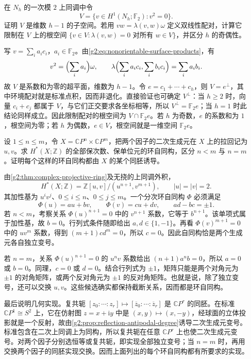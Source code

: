 \begin{exercise}\label{g2:ex:nonorientable-square-kernel}
	在 \(N_h\) 的一次模 \(2\) 上同调中令
	\[
		V=\{v\in H^1(N_h;\mathbb F_2):v^2=0\}.
	\]
	证明 \(V\) 是维数 \(h-1\) 的子空间。若用 \(vw=\lambda(v,w)\omega\) 定义双线性配对，计算它限制在 \(V\) 上的根空间 \(\{v\in V:\lambda(v,w)=0\text{ 对所有 }w\in V\}\)，并区分 \(h\) 的奇偶性。
\end{exercise}
\begin{solution}
	写 \(v=\sum_i a_ic_i\)，\(a_i\in\mathbb F_2\)。由\eqref{g2:eq:nonorientable-surface-products}，有
	\[
		v^2=\Bigl(\sum_i a_i\Bigr)\omega,\qquad
		\lambda\Bigl(\sum_i a_ic_i,\sum_i b_ic_i\Bigr)=\sum_i a_ib_i.
	\]
	故 \(V\) 是系数和为零的超平面，维数为 \(h-1\)。令 \(e=c_1+\cdots+c_h\)，则 \(V=e^\perp\)，其中环境配对就是标准点积，因而非退化。直接验证也可确定 \(V^\perp\)：当 \(h\geq2\) 时，向量 \(c_i+c_j\) 都属于 \(V\)，与它们正交要求各坐标相等，所以 \(V^\perp=\mathbb F_2e\)；当 \(h=1\) 时此结论同样成立。因此限制配对的根空间为 \(V\cap\mathbb F_2e\)。若 \(h\) 为奇数，\(e\) 的系数和为 \(1\)，根空间为零；若 \(h\) 为偶数，\(e\in V\)，根空间就是一维空间 \(\mathbb F_2e\)。
\end{solution}

\begin{exercise}\label{g2:ex:projective-product-ring-automorphisms}
	设 \(1\leq n\leq m\)，令 \(X=\mathbb CP^n\times\mathbb CP^m\)，把两个因子的二次生成元在 \(X\) 上的拉回记为 \(u,v\)。求 \(H^*(X;\mathbb Z)\) 的全部保次数、保单位元的环自同构，区分 \(n<m\) 与 \(n=m\)。证明每个这样的环自同构都由 \(X\) 的某个同胚诱导。
\end{exercise}
\begin{solution}
	由\cref{g2:thm:complex-projective-ring}及无挠的上同调外积，
	\[
		H^*(X;\mathbb Z)=\mathbb Z[u,v]/(u^{n+1},v^{m+1}),\qquad |u|=|v|=2.
	\]
	其加性基为 \(u^iv^j\)、\(0\leq i\leq n\)、\(0\leq j\leq m\)。一个分次环自同构 \(\Phi\) 必须满足
	\[
		\Phi(u)=au+bv,\qquad\Phi(v)=cu+dv,\qquad ad-bc=\pm1.
	\]
	若 \(n<m\)，考察关系 \(\Phi(u)^{n+1}=0\) 中的 \(v^{n+1}\) 系数，它等于 \(b^{n+1}\)。该单项式属于加性基，故 \(b=0\)。行列式条件随即给出 \(a,d\in\{1,-1\}\)。再看 \(\Phi(v)^{m+1}=0\) 中的 \(uv^m\) 系数，得到 \((m+1)cd^m=0\)，所以 \(c=0\)。因此自同构恰是两个生成元各自独立变号。

	若 \(n=m\)，关系 \(\Phi(u)^{n+1}=0\) 的 \(u^nv\) 系数给出 \((n+1)a^nb=0\)，所以 \(a=0\) 或 \(b=0\)。同理，\(c=0\) 或 \(d=0\)。结合行列式为 \(\pm1\)，矩阵只能是两个对角元为 \(\pm1\) 的对角矩阵，或两个反对角元为 \(\pm1\) 的反对角矩阵。也就是说，除了独立变号，还可以交换 \(u,v\)。这些候选确实都保持截断关系，因而都是环自同构。

	最后说明几何实现。复共轭 \([z_0:\cdots:z_r]\mapsto[\overline z_0:\cdots:\overline z_r]\) 是 \(\mathbb CP^r\) 的同胚。在标准 \(\mathbb CP^1\cong S^2\) 上，它在仿射图 \(z=x+\mathrm{i}y\) 中是 \((x,y)\mapsto(x,-y)\)，经球面的立体投影就是一个反射，故由\cref{g2:prop:reflection-antipodal-degree}诱导二次生成元变号。标准包含在二次上同调上为同构，所以复共轭在任意 \(\mathbb CP^r\) 上也使二次生成元变号。对两个因子分别选恒等或复共轭，即实现全部独立变号；当 \(n=m\) 时，再用交换两个因子的同胚实现交换。因而上面列出的每个环自同构都有所要求的实现。
\end{solution}
